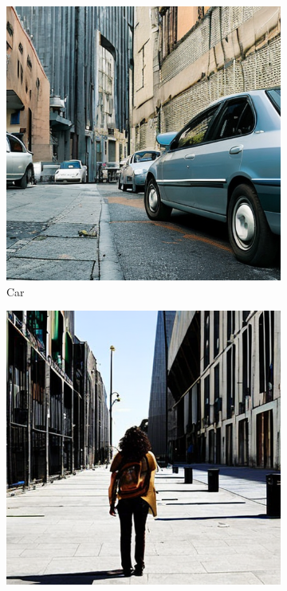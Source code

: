 \begin{figure}
\centering
  \begin{subfigure}{0.24\columnwidth}
   \includegraphics[width=\columnwidth]{img/4-experiments/dataset_example_car.png}
   \caption{Car}
   \label{subfig:dataset-example-car}
  \end{subfigure}
  \begin{subfigure}{0.24\columnwidth}
   \includegraphics[width=\columnwidth]{img/4-experiments/dataset_example_person.png}

\end{subfigure}
\end{figure}

